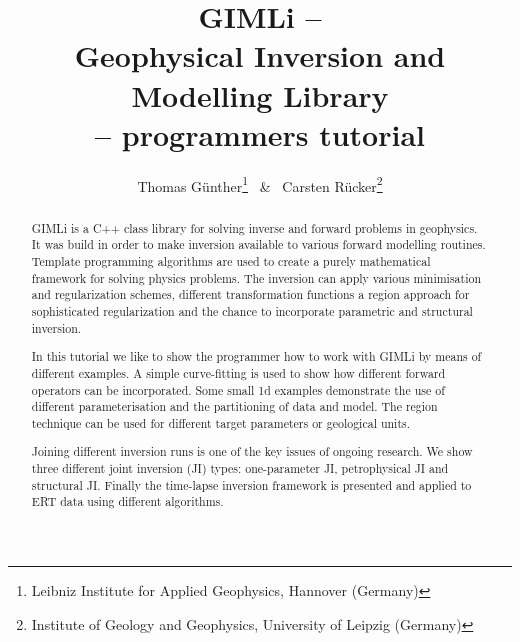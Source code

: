 \documentclass[a4paper,DIV12]{scrartcl}
\author{
Thomas G{\"u}nther\thanks{Leibniz Institute for Applied Geophysics, Hannover (Germany)} 
\ \& \ 
Carsten R{\"u}cker\thanks{Institute of Geology and Geophysics, University of Leipzig (Germany)}
}
\title{GIMLi --\\ Geophysical Inversion and Modelling Library \\-- programmers tutorial}
\begin{document}
\maketitle
\begin{abstract}
GIMLi is a C++ class library for solving inverse and forward problems in geophysics.
It was build in order to make inversion available to various forward modelling routines.
Template programming algorithms are used to create a purely mathematical framework for solving physics problems.
The inversion can apply various minimisation and regularization schemes, different transformation functions a region approach for sophisticated regularization and the chance to incorporate parametric and structural inversion.

In this tutorial we like to show the programmer how to work with GIMLi by means of different examples.
A simple curve-fitting is used to show how different forward operators can be incorporated.
Some small 1d examples demonstrate the use of different parameterisation and the partitioning of data and model.
The region technique can be used for different target parameters or geological units.

Joining different inversion runs is one of the key issues of ongoing research.
We show three different joint inversion (JI) types: one-parameter JI, petrophysical JI and structural JI.
Finally the time-lapse inversion framework is presented and applied to ERT data using different algorithms.
\end{abstract}

\clearpage
\tableofcontents











\end{document}
